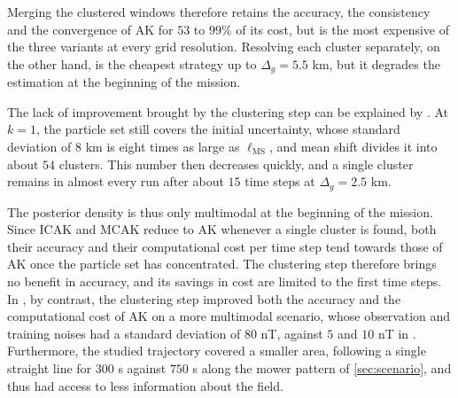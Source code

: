 Merging the clustered windows therefore retains the accuracy, the consistency and the convergence of AK for $53$ to $99\%$ of its cost, but is the most expensive of the three variants at every grid resolution. Resolving each cluster separately, on the other hand, is the cheapest strategy up to $\Delta_g=5.5$ km, but it degrades the estimation at the beginning of the mission.

The lack of improvement brought by the clustering step can be explained by . At $k=1$, the particle set still covers the initial uncertainty, whose standard deviation of $8$ km is eight times as large as $\ell_{\mathrm{MS}}$, and mean shift divides it into about $54$ clusters. This number then decreases quickly, and a single cluster remains in almost every run after about $15$ time steps at $\Delta_g=2.5$ km.

The posterior density is thus only multimodal at the beginning of the mission. Since ICAK and MCAK reduce to AK whenever a single cluster is found, both their accuracy and their computational cost per time step tend towards those of AK once the particle set has concentrated. The clustering step therefore brings no benefit in accuracy, and its savings in cost are limited to the first time steps. In \cite{bib:AK-PF-clustered}, by contrast, the clustering step improved both the accuracy and the computational cost of AK on a more multimodal scenario, whose observation and training noises had a standard deviation of $80$ nT, against $5$ and $10$ nT in . Furthermore, the studied trajectory covered a smaller area, following a single straight line for $300$ s against $750$ s along the mower pattern of \cref{sec:scenario}, and thus had access to less information about the field.
